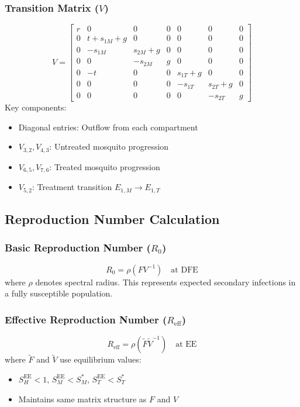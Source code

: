 \documentclass{article}
\begin{document}
\subsubsection{Transition Matrix ($V$)}
\[
V = \begin{bmatrix}
r & 0 & 0 & 0 & 0 & 0 & 0 \\
0 & t+s_{1M}+g & 0 & 0 & 0 & 0 & 0 \\
0 & -s_{1M} & s_{2M}+g & 0 & 0 & 0 & 0 \\
0 & 0 & -s_{2M} & g & 0 & 0 & 0 \\
0 & -t & 0 & 0 & s_{1T}+g & 0 & 0 \\
0 & 0 & 0 & 0 & -s_{1T} & s_{2T}+g & 0 \\
0 & 0 & 0 & 0 & 0 & -s_{2T} & g
\end{bmatrix}
\]
Key components:
\begin{itemize}
    \item Diagonal entries: Outflow from each compartment
    \item $V_{3,2}, V_{4,3}$: Untreated mosquito progression
    \item $V_{6,5}, V_{7,6}$: Treated mosquito progression
    \item $V_{5,2}$: Treatment transition $E_{1,M} \rightarrow E_{1,T}$
\end{itemize}

\subsection{Reproduction Number Calculation}
\subsubsection{Basic Reproduction Number ($R_0$)}
\[
R_0 = \rho(FV^{-1}) \quad \text{at DFE}
\]
where $\rho$ denotes spectral radius. This represents expected secondary infections in a fully susceptible population.

\subsubsection{Effective Reproduction Number ($R_{\text{eff}}$)}
\[
R_{\text{eff}} = \rho(\tilde{F}\tilde{V}^{-1}) \quad \text{at EE}
\]
where $\tilde{F}$ and $\tilde{V}$ use equilibrium values:
\begin{itemize}
    \item $S_H^{\text{EE}} < 1$, $S_M^{\text{EE}} < S_M^*$, $S_T^{\text{EE}} < S_T^*$
    \item Maintains same matrix structure as $F$ and $V$
\end{itemize}
\end{document}
